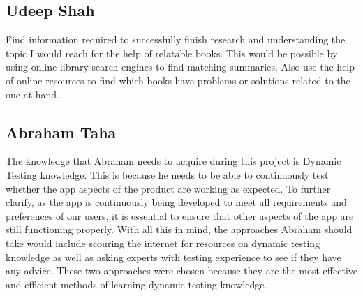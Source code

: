\documentclass[12pt, titlepage]{article}
\begin{document}
\subsection*{Udeep Shah}
Find information required to successfully finish research and understanding the topic I would reach for the help of relatable books. This would be possible by using online library search engines to find matching summaries. Also use the help of online resources to find which books have problems or solutions related to the one at hand.

\subsection*{Abraham Taha}
The knowledge that Abraham needs to acquire during this project is Dynamic Testing knowledge.
This is because he needs to be able to continuously test whether the app aspects of the product are working as expected.
To further clarify, as the app is continuously being developed to meet all requirements and preferences of our users, it is essential to ensure that other aspects of the app are still functioning properly.
With all this in mind, the approaches Abraham should take would include scouring the internet for resources on dynamic testing knowledge as well as asking experts with testing experience to see if they have any advice.
These two approaches were chosen because they are the most effective and efficient methods of learning dynamic testing knowledge.
\end{document}
